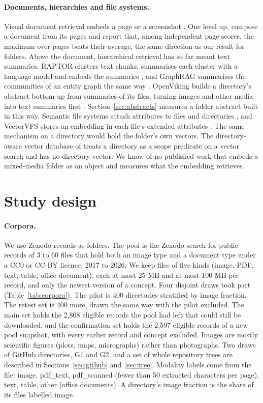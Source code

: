 \documentclass[sigconf,natbib=true,anonymous=true]{acmart}
\begin{document}
\paragraph{Documents, hierarchies and file systems.} Visual document retrieval embeds a page or a screenshot \citep{faysse2025colpali,ma2024dse,yu2025visrag}. One level up, \citet{you2026docpc} compose a document from its pages and report that, among independent page scores, the maximum over pages beats their average, the same direction as our result for folders. Above the document, hierarchical retrieval has so far meant text summaries. RAPTOR clusters text chunks, summarises each cluster with a language model and embeds the summaries \citep{sarthi2024raptor}, and GraphRAG summarises the communities of an entity graph the same way \citep{edge2024graphrag}. OpenViking builds a directory's abstract bottom-up from summaries of its files, turning images and other media into text summaries first \citep{openviking2026docs}. Section~\ref{sec:abstracts} measures a folder abstract built in this way. Semantic file systems attach attributes to files and directories \citep{gifford1991sfs}, and VectorVFS stores an embedding in each file's extended attributes \citep{perone2025vectorvfs}. The same mechanism on a directory would hold the folder's own vectors. The directory-aware vector database of \citet{wang2026directoryaware} treats a directory as a scope predicate on a vector search and has no directory vector. We know of no published work that embeds a mixed-media folder as an object and measures what the embedding retrieves.

\section{Study design}
\label{sec:design}

\paragraph{Corpora.} We use Zenodo records as folders. The pool is the Zenodo search for public records of 3 to 60 files that hold both an image type and a document type under a CC0 or CC-BY licence, 2017 to 2026. We keep files of five kinds (image, PDF, text, table, office document), each at most 25 MB and at most 100 MB per record, and only the newest version of a concept. Four disjoint draws took part (Table~\ref{tab:corpora}). The pilot is 400 directories stratified by image fraction. The retest set is 400 more, drawn the same way with the pilot excluded. The main set holds the 2,808 eligible records the pool had left that could still be downloaded, and the confirmation set holds the 2,597 eligible records of a new pool snapshot, with every earlier record and concept excluded. Images are mostly scientific figures (plots, maps, micrographs) rather than photographs. Two draws of GitHub directories, G1 and G2, and a set of whole repository trees are described in Sections~\ref{sec:github} and~\ref{sec:tree}. Modality labels come from the file: image, pdf\_text, pdf\_scanned (fewer than 50 extracted characters per page), text, table, other (office documents). A directory's image fraction is the share of its files labelled image.
\end{document}
